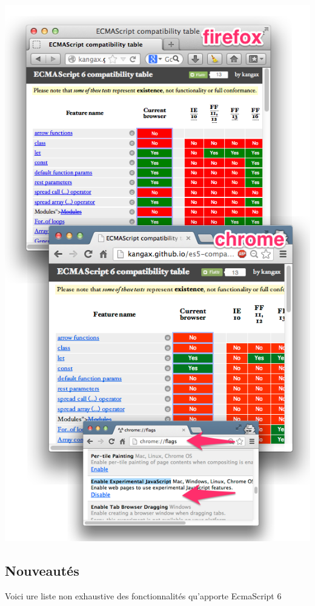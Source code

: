 \begin{center}
\includegraphics[scale=0.7]{img/es6-compatibility.png}
\label{Plateforme Wakanda}
\end{center}

\subsection{Nouveautés}

Voici ure liste non exhaustive des fonctionnalités qu’apporte EcmaScript 6

